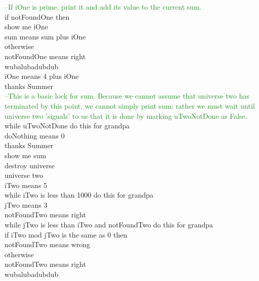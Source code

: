 \documentclass[preprint]{sigplanconf}
\begin{document}
{\textcolor{ForestGreen}{    --If iOne is prime, print it and add its value to the current sum.} \\
\indent \indent if notFoundOne then \\
\indent \indent \indent show me iOne \\
\indent \indent \indent sum means sum plus iOne \\
\indent \indent otherwise \\
\indent \indent \indent notFoundOne means right \\
\indent \indent wubalubadubdub \\

\indent \indent \noindent iOne means 4 plus iOne \\
\indent \noindent thanks Summer \\

\textcolor{ForestGreen}{  --This is a basic lock for sum. Because we cannot assume that universe two has terminated by this point, we cannot simply print sum; rather we must wait until universe two 'signals' to us that it is done by marking uTwoNotDone as False.} \\
\indent while uTwoNotDone do this for grandpa \\
\indent \indent doNothing means 0 \\
\indent thanks Summer \\

\indent \noindent show me sum \\

\noindent destroy universe \\


\noindent universe two \\

\indent \noindent iTwo means 5 \\

\indent \noindent while iTwo is less than 1000 do this for grandpa \\

\indent \indent \noindent jTwo means 3 \\

\indent \indent \noindent notFoundTwo means right \\

\indent \indent \noindent while jTwo is less than iTwo and notFoundTwo do this for grandpa \\

\indent \indent \indent \noindent if iTwo mod jTwo is the same as 0 then \\
\indent \indent \indent \indent notFoundTwo means wrong \\
\indent \indent \indent otherwise \\
\indent \indent \indent \indent notFoundTwo means right \\
\indent \indent \indent wubalubadubdub \\

}
\end{document}

